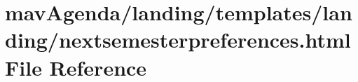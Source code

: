 \hypertarget{nextsemesterpreferences_8html}{}\section{mav\+Agenda/landing/templates/landing/nextsemesterpreferences.html File Reference}
\label{nextsemesterpreferences_8html}

